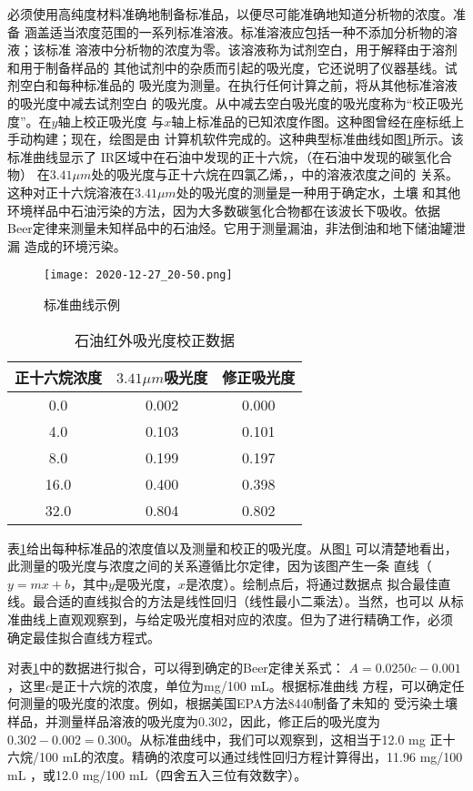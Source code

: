 必须使用高纯度材料准确地制备标准品，以便尽可能准确地知道分析物的浓度。准备
涵盖适当浓度范围的一系列标准溶液。标准溶液应包括一种不添加分析物的溶液；该标准
溶液中分析物的浓度为零。该溶液称为试剂空白，用于解释由于溶剂和用于制备样品的
其他试剂中的杂质而引起的吸光度，它还说明了仪器基线。试剂空白和每种标准品的
吸光度为测量。在执行任何计算之前，将从其他标准溶液的吸光度中减去试剂空白
的吸光度。从中减去空白吸光度的吸光度称为“校正吸光度”。在$y$轴上校正吸光度
与$x$轴上标准品的已知浓度作图。这种图曾经在座标纸上手动构建；现在，绘图是由
计算机软件完成的。这种典型标准曲线如图\ref{fig:2.11}所示。该标准曲线显示了
IR区域中在石油中发现的正十六烷，（在石油中发现的碳氢化合物）
在$3.41\mu m$处的吸光度与正十六烷在四氯乙烯，，中的溶液浓度之间的
关系。这种对正十六烷溶液在$3.41\mu m$处的吸光度的测量是一种用于确定水，土壤
和其他环境样品中石油污染的方法，因为大多数碳氢化合物都在该波长下吸收。依据
Beer定律来测量未知样品中的石油烃。它用于测量漏油，非法倒油和地下储油罐泄漏
造成的环境污染。
\begin{figure}[htpb]
    \centering
    \texttt{[image: 2020-12-27\_20-50.png]}
    \caption{标准曲线示例}
    \label{fig:2.11}
\end{figure}
\begin{table}[htbp]
    \centering
    \caption{石油红外吸光度校正数据}
    \label{tab:2.4}
    \begin{tabular}{ccc}
        \hline
        正十六烷浓度 & $3.41\mu m$吸光度  &  修正吸光度\\
        \hline
        0.0  &  0.002   &  0.000  \\
        4.0  &  0.103   &  0.101  \\
        8.0  &  0.199   &  0.197  \\
        16.0  &  0.400   &  0.398  \\
        32.0  &  0.804   &  0.802  \\
        \hline
    \end{tabular}
\end{table}

表\ref{tab:2.4}给出每种标准品的浓度值以及测量和校正的吸光度。从图\ref{fig:2.11}
可以清楚地看出，此测量的吸光度与浓度之间的关系遵循比尔定律，因为该图产生一条
直线（$y = mx + b$，其中$y$是吸光度，$x$是浓度）。绘制点后，将通过数据点
拟合最佳直线。最合适的直线拟合的方法是线性回归（线性最小二乘法）。当然，也可以
从标准曲线上直观观察到，与给定吸光度相对应的浓度。但为了进行精确工作，必须
确定最佳拟合直线方程式。

对表\ref{tab:2.4}中的数据进行拟合，可以得到确定的Beer定律关系式：
$A=0.0250 c - 0.001$，这里$c$是正十六烷的浓度，单位为mg/100 mL。根据标准曲线
方程，可以确定任何测量的吸光度的浓度。例如，根据美国EPA方法8440制备了未知的
受污染土壤样品，并测量样品溶液的吸光度为0.302，因此，修正后的吸光度为
$0.302 - 0.002 = 0.300$。从标准曲线中，我们可以观察到，这相当于12.0 mg
正十六烷/100 mL的浓度。精确的浓度可以通过线性回归方程计算得出，11.96 mg/100 mL
，或12.0 mg/100 mL（四舍五入三位有效数字）。

